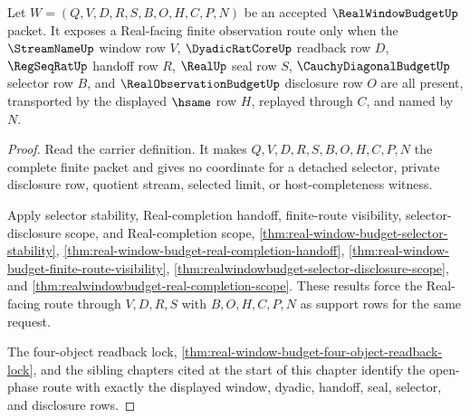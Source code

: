 \begin{theorem}
\label{thm:real-window-budget-open-phase-window-selector-lock}
Let $W=(Q,V,D,R,S,B,O,H,C,P,N)$ be an accepted $\RealWindowBudgetUp$ packet.
It exposes a Real-facing finite observation route only when the
$\StreamNameUp$ window row $V$, $\DyadicRatCoreUp$ readback row $D$,
$\RegSeqRatUp$ handoff row $R$, $\RealUp$ seal row $S$,
$\CauchyDiagonalBudgetUp$ selector row $B$, and $\RealObservationBudgetUp$
disclosure row $O$ are all present, transported by the displayed $\hsame$ row
$H$, replayed through $C$, and named by $N$.
\end{theorem}
\begin{proof}
Read the carrier definition. It makes $Q,V,D,R,S,B,O,H,C,P,N$ the complete
finite packet and gives no coordinate for a detached selector, private
disclosure row, quotient stream, selected limit, or host-completeness witness.

Apply selector stability, Real-completion handoff, finite-route visibility,
selector-disclosure scope, and Real-completion scope,
\autoref{thm:real-window-budget-selector-stability},
\autoref{thm:real-window-budget-real-completion-handoff},
\autoref{thm:real-window-budget-finite-route-visibility},
\autoref{thm:realwindowbudget-selector-disclosure-scope}, and
\autoref{thm:realwindowbudget-real-completion-scope}. These results force the
Real-facing route through $V,D,R,S$ with $B,O,H,C,P,N$ as support rows for the
same request.

The four-object readback lock,
\autoref{thm:real-window-budget-four-object-readback-lock}, and the sibling
chapters cited at the start of this chapter identify the open-phase route with
exactly the displayed window, dyadic, handoff, seal, selector, and disclosure
rows.
\end{proof}

